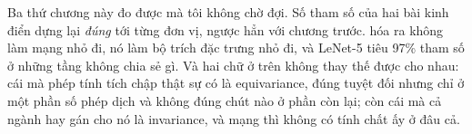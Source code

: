 Ba thứ chương này đo được mà tôi không chờ đợi. Số tham số của hai bài kinh
điển dựng lại \emph{đúng} tới từng đơn vị, ngược hẳn với chương trước.
 hóa ra không làm mạng nhỏ đi, nó làm bộ
trích đặc trưng nhỏ đi, và LeNet-5 tiêu 97\% tham số ở những tầng không chia sẻ
gì. Và hai chữ ở trên không thay thế được cho nhau: cái mà phép tính tích chập
thật sự có là equivariance, đúng tuyệt đối nhưng chỉ ở một phần số phép dịch và
không đúng chút nào ở phần còn lại; còn cái mà cả ngành hay gán cho nó là
invariance, và mạng thì không có tính chất ấy ở đâu cả.








